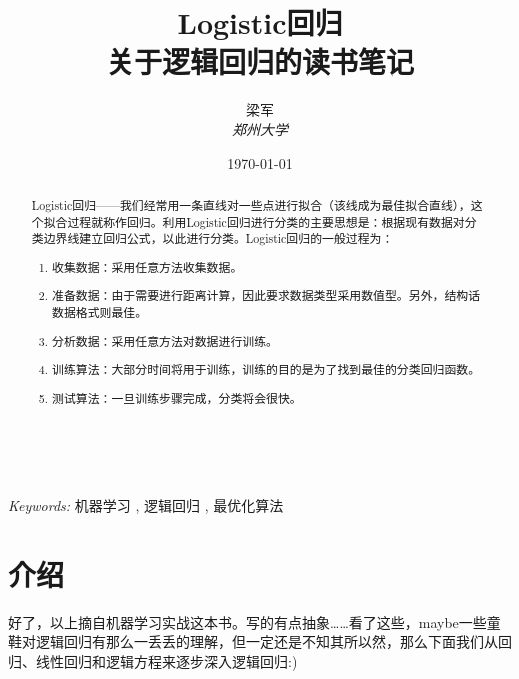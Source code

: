 \documentclass[a4paper, 11pt, UTF8]{ctexart} %
\title{\textbf{Logistic回归}\\ %
关于逻辑回归的读书笔记} %
\author{\textsc{梁军} %
\\{\textit{郑州大学}}} %
\date{\today} %
\makeatletter
\renewcommand{\maketitle}{ %
\begin{flushright} %
{\LARGE\@title} %

\vspace{50pt} %

{\large\@author} %
\\\@date %

\vspace{40pt} %
\end{flushright}
}
\makeatother
\begin{document}
\maketitle %



\begin{abstract}
Logistic回归——我们经常用一条直线对一些点进行拟合（该线成为最佳拟合直线），这个拟合过程就称作回归。利用Logistic回归进行分类的主要思想是：根据现有数据对分类边界线建立回归公式，以此进行分类。Logistic回归的一般过程为：

\begin{enumerate}
\item 收集数据：采用任意方法收集数据。
\item 准备数据：由于需要进行距离计算，因此要求数据类型采用数值型。另外，结构话数据格式则最佳。
\item 分析数据：采用任意方法对数据进行训练。
\item 训练算法：大部分时间将用于训练，训练的目的是为了找到最佳的分类回归函数。
\item 测试算法：一旦训练步骤完成，分类将会很快。
\end{enumerate}

\end{abstract}

\hspace*{3,6mm}\textit{Keywords:} 机器学习 , 逻辑回归 , 最优化算法 %

\vspace{30pt} %


\section{介绍}

好了，以上摘自机器学习实战这本书。写的有点抽象……看了这些，maybe一些童鞋对逻辑回归有那么一丢丢的理解，但一定还是不知其所以然，那么下面我们从回归、线性回归和逻辑方程来逐步深入逻辑回归:)
\end{document}
